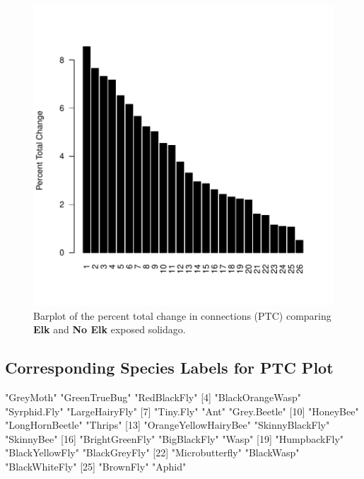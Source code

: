 \documentclass[11pt]{amsart}
\begin{document}
\begin{figure} 
\begin{center} 
\includegraphics{SPN_figures-bpptc}
\end{center} 
\caption{Barplot of the percent total change in connections (PTC)
  comparing \textbf{Elk} and \textbf{No Elk} exposed solidago.} 
\label{fig:six}
\end{figure}

\pagebreak

\subsection*{Corresponding Species Labels for PTC Plot}
\begin{Schunk}
\begin{Soutput}
 [1] "GreyMoth"             "GreenTrueBug"         "RedBlackFly"         
 [4] "BlackOrangeWasp"      "Syrphid.Fly"          "LargeHairyFly"       
 [7] "Tiny.Fly"             "Ant"                  "Grey.Beetle"         
[10] "HoneyBee"             "LongHornBeetle"       "Thrips"              
[13] "OrangeYellowHairyBee" "SkinnyBlackFly"       "SkinnyBee"           
[16] "BrightGreenFly"       "BigBlackFly"          "Wasp"                
[19] "HumpbackFly"          "BlackYellowFly"       "BlackGreyFly"        
[22] "Microbutterfly"       "BlackWasp"            "BlackWhiteFly"       
[25] "BrownFly"             "Aphid"               
\end{Soutput}
\end{Schunk}
\end{document}
